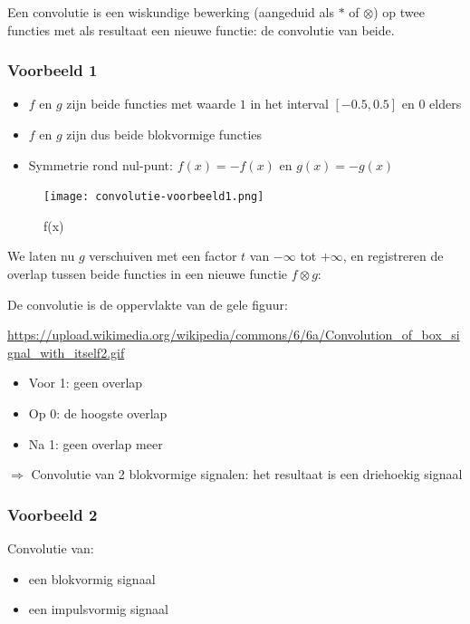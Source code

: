\documentclass{article}
\begin{document}
Een convolutie is een wiskundige bewerking (aangeduid als $*$ of $\otimes$) op twee functies
met als resultaat een nieuwe functie: de convolutie van beide.

\subsubsection{Voorbeeld 1}

\begin{itemize}
    \item $f$ en $g$ zijn beide functies met waarde $1$ in het interval $[-0.5, 0.5]$ en $0$ elders
    \item $f$ en $g$ zijn dus beide blokvormige functies
    \item Symmetrie rond nul-punt: $f(x) = -f(x)$ en $g(x) = -g(x)$
\end{itemize}

\begin{figure}[H]
    \centering
    \texttt{[image: convolutie-voorbeeld1.png]}
    \caption{f(x)}
\end{figure}

We laten nu $g$ verschuiven met een factor $t$ van $-\infty$ tot $+\infty$,
en registreren de overlap tussen beide functies in een nieuwe functie $f \otimes g$:

De convolutie is de oppervlakte van de gele figuur:

\url{https://upload.wikimedia.org/wikipedia/commons/6/6a/Convolution_of_box_signal_with_itself2.gif}

\begin{itemize}
    \item Voor 1: geen overlap
    \item Op 0: de hoogste overlap
    \item Na 1: geen overlap meer
\end{itemize}

$\Rightarrow$ Convolutie van 2 blokvormige signalen: het resultaat is een driehoekig signaal

\subsubsection{Voorbeeld 2}

Convolutie van:

\begin{itemize}
    \item een blokvormig signaal
    \item een impulsvormig signaal
\end{itemize}
\end{document}
